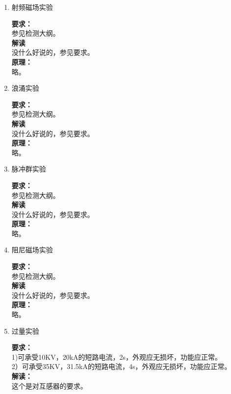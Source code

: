 \documentclass{article}
\begin{document}
\begin{CJK}{UTF8}{gbsn}
\begin{enumerate}
\item 射频磁场实验
	\par
	\textbf{要求：}\\
	参见检测大纲。\\
	\textbf{解读}\\
	没什么好说的，参见要求。\\
	\textbf{原理：}\\
	略。

\item 浪涌实验
	\par
	\textbf{要求：}\\
	参见检测大纲。\\
	\textbf{解读}\\
	没什么好说的，参见要求。\\
	\textbf{原理：}\\
	略。

\item 脉冲群实验
	\par
	\textbf{要求：}\\
	参见检测大纲。\\
	\textbf{解读}\\
	没什么好说的，参见要求。\\
	\textbf{原理：}\\
	略。

\item 阻尼磁场实验
	\par
	\textbf{要求：}\\
	参见检测大纲。\\
	\textbf{解读}\\
	没什么好说的，参见要求。\\
	\textbf{原理：}\\
	略。

\item 过量实验
	\par
	\textbf{要求：}\\
	1)可承受10KV，20kA的短路电流，2s，外观应无损坏，功能应正常。\\
	2）可承受35KV，31.5kA的短路电流，4s，外观应无损坏，功能应正常。\\
	\textbf{解读：}\\
	这个是对互感器的要求。


\end{enumerate}
\end{CJK}
\end{document}
